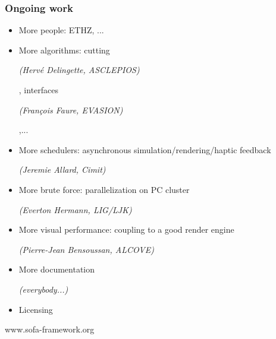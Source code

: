 \documentclass[a4paper,compress]{beamer}
\begin{document}

\begin{frame}
\frametitle{Ongoing work}
\begin{itemize}
\item More people: ETHZ, ...
\item More algorithms: cutting \begin{small}\textit{(Herv\'e Delingette, ASCLEPIOS)}\end{small}, interfaces \begin{small}\textit{(Fran\c{c}ois Faure, EVASION)}\end{small},... 
\item More schedulers: asynchronous simulation/rendering/haptic feedback \begin{small}\textit{(Jeremie Allard, Cimit)}\end{small}
\item More brute force: parallelization on PC cluster \begin{small}\em (Everton Hermann, LIG/LJK)\end{small}
\item More visual performance: coupling to a good render engine \begin{small}\textit{ (Pierre-Jean Bensoussan, ALCOVE)}\end{small}
\item More documentation \begin{small}\textit{(everybody...)}\end{small}
\item Licensing
\end{itemize}

\vspace{1cm}
\begin{center}
\Large
 www.sofa-framework.org
\end{center}


\end{frame}
\end{document}
